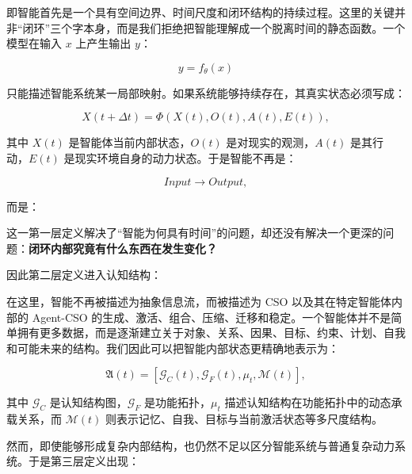 即智能首先是一个具有空间边界、时间尺度和闭环结构的持续过程。这里的关键并非“闭环”三个字本身，而是我们拒绝把智能理解成一个脱离时间的静态函数。一个模型在输入 \(x\) 上产生输出 \(y\)：

\[
y=f_{\theta}(x)
\]

只能描述智能系统某一局部映射。如果系统能够持续存在，其真实状态必须写成：

\[
X(t+\Delta t)
=
\Phi
\left(
X(t),
O(t),
A(t),
E(t)
\right),
\]

其中 \(X(t)\) 是智能体当前内部状态，\(O(t)\) 是对现实的观测，\(A(t)\) 是其行动，\(E(t)\) 是现实环境自身的动力状态。于是智能不再是：

\[
Input\rightarrow Output,
\]

而是：

\begin{statementbox}
\centering
{}
\end{statementbox}

这一第一层定义解决了“智能为何具有时间”的问题，却还没有解决一个更深的问题：\textbf{闭环内部究竟有什么东西在发生变化？}

因此第二层定义进入认知结构：

\begin{statementbox}
\centering
{}
\end{statementbox}

在这里，智能不再被描述为抽象信息流，而被描述为 CSO 以及其在特定智能体内部的 Agent-CSO 的生成、激活、组合、压缩、迁移和稳定。一个智能体并不是简单拥有更多数据，而是逐渐建立关于对象、关系、因果、目标、约束、计划、自我和可能未来的结构。我们因此可以把智能内部状态更精确地表示为：

\[
\mathfrak A(t)
=
\left[
\mathcal G_C(t),
\mathcal G_F(t),
\mu_t,
\mathcal M(t)
\right],
\]

其中 \(\mathcal G_C\) 是认知结构图，\(\mathcal G_F\) 是功能拓扑，\(\mu_t\) 描述认知结构在功能拓扑中的动态承载关系，而 \(\mathcal M(t)\) 则表示记忆、自我、目标与当前激活状态等多尺度结构。

然而，即使能够形成复杂内部结构，也仍然不足以区分智能系统与普通复杂动力系统。于是第三层定义出现：

\begin{statementbox}
\centering
{}
\end{statementbox}

